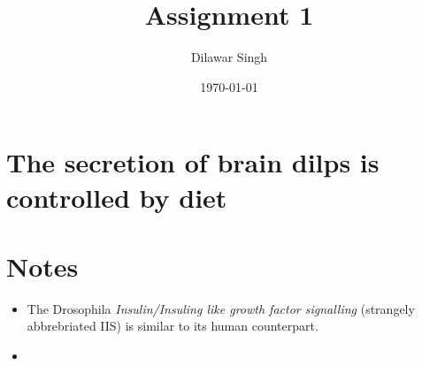 \documentclass[]{article}
\title{Assignment 1}
\author{Dilawar Singh}
\date{\today}
\begin{document}
\maketitle

\section{The secretion of brain dilps is controlled by diet}
\label{the-secretion-of-brain-dilps-is-controlled-by-diet}



\section{Notes}\label{notes}

\begin{itemize}
\item
  The Drosophila \emph{Insulin/Insuling like growth factor signalling}
  (strangely abbrebriated IIS) is similar to its human counterpart.
\item
\end{itemize}
\end{document}
